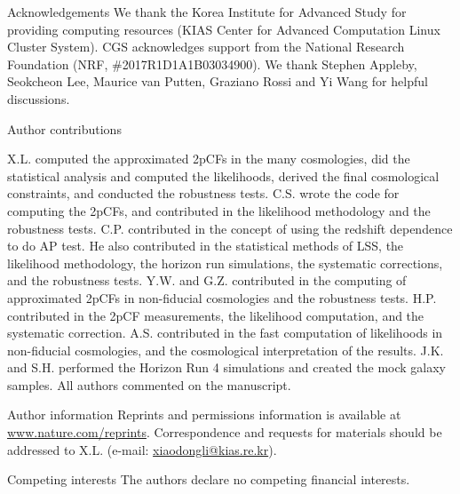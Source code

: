 \documentclass{natureprintstyle}
\begin{document}
\begin{addendum}
\item [Acknowledgements] 
We thank the Korea Institute for Advanced Study for providing computing resources (KIAS Center for Advanced Computation Linux Cluster System).
CGS acknowledges support from the National Research Foundation (NRF,  \#2017R1D1A1B03034900). 
We thank Stephen Appleby, Seokcheon Lee, Maurice van Putten, Graziano Rossi and Yi Wang for helpful discussions.


\item[Author contributions] 

X.L. computed the approximated 2pCFs in the many cosmologies, did the statistical analysis and computed the likelihoods, 
derived the final cosmological constraints, and conducted the robustness tests. 
C.S. wrote the code for computing the 2pCFs, and contributed in the likelihood methodology and the robustness tests. 
C.P. contributed in the concept of using the redshift dependence to do AP test.
He also contributed in the statistical methods of LSS, the likelihood methodology,
the horizon run simulations, the systematic corrections, and the robustness tests.
Y.W. and G.Z. contributed in the computing of approximated 2pCFs in non-fiducial cosmologies and the robustness tests.
H.P. contributed in the 2pCF measurements, the likelihood computation, and the systematic correction.
A.S. contributed in the fast computation of likelihoods in non-fiducial cosmologies, and the cosmological interpretation of the results.
J.K. and S.H. performed the Horizon Run 4 simulations and created the mock galaxy samples.
All authors commented on the manuscript.


\item[Author information]
Reprints and permissions information is available at \href{www.nature.com/reprints}{www.nature.com/reprints}.
Correspondence and requests for materials should be addressed to X.L. (e-mail: \href{mailto:xiaodongli@kias.re.kr}{xiaodongli@kias.re.kr}).

\item[Competing interests]
The authors declare no competing financial interests.

\end{addendum}



\newpage
\end{document}
